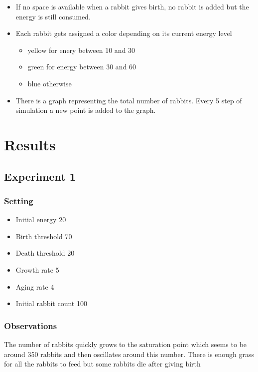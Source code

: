 \documentclass[11pt]{article}
\begin{document}
\begin{itemize}
        \item  If no space is available when a rabbit gives birth,
          no rabbit is added but the energy is still consumed.

	\item Each rabbit gets assigned a color depending on its
          current energy level
	\begin{itemize}
		\item yellow for enery between 10 and 30
		\item green for energy between 30 and 60
		\item blue otherwise
         \end{itemize}
       \item There is a graph representing the total number of
         rabbits. Every 5 step of simulation a new point is added to
         the graph.

\end{itemize}

\section{Results}

\subsection{Experiment 1}

\subsubsection{Setting}

\begin{itemize}
  \item Initial energy 20
  \item Birth threshold 70
  \item Death threshold 20
  \item Growth rate 5
  \item Aging rate 4
  \item Initial rabbit count 100
\end{itemize}

\subsubsection{Observations}
The number of rabbits quickly grows to the saturation point which
seems to be around 350 rabbits and then oscillates around this
number. There is enough grass for all the rabbits to feed but some
rabbits die after giving birth
\end{document}
